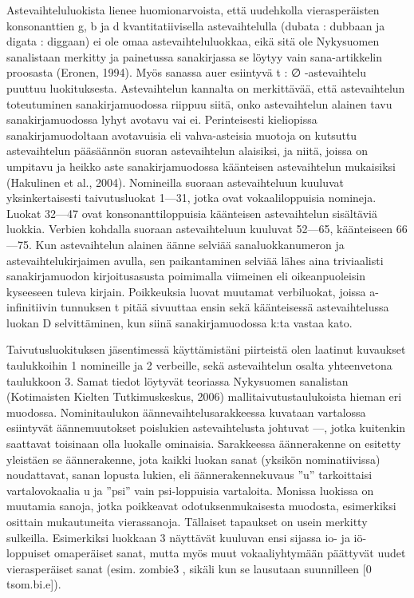 \documentclass[free]{flammie}
\begin{document}
Astevaihteluluokista lienee huomionarvoista, että uudehkolla vierasperäisten konsonanttien g, b ja d kvantitatiivisella astevaihtelulla (dubata : dubbaan ja digata :
diggaan) ei ole omaa astevaihteluluokkaa, eikä sitä ole Nykysuomen sanalistaan
merkitty ja painetussa sanakirjassa se löytyy vain sana-artikkelin proosasta (Eronen, 1994). Myös sanassa auer esiintyvä t : ∅ -astevaihtelu puuttuu luokituksesta.
Astevaihtelun kannalta on merkittävää, että astevaihtelun toteutuminen sanakirjamuodossa riippuu siitä, onko astevaihtelun alainen tavu sanakirjamuodossa lyhyt avotavu vai ei. Perinteisesti kieliopissa sanakirjamuodoltaan avotavuisia eli
vahva-asteisia muotoja on kutsuttu astevaihtelun pääsäännön suoran astevaihtelun
alaisiksi, ja niitä, joissa on umpitavu ja heikko aste sanakirjamuodossa käänteisen
astevaihtelun mukaisiksi (Hakulinen et al., 2004). Nomineilla suoraan astevaihteluun kuuluvat yksinkertaisesti taivutusluokat 1—31, jotka ovat vokaaliloppuisia
nomineja. Luokat 32—47 ovat konsonanttiloppuisia käänteisen astevaihtelun sisältäviä luokkia. Verbien kohdalla suoraan astevaihteluun kuuluvat 52—65, käänteiseen 66—75. Kun astevaihtelun alainen äänne selviää sanaluokkanumeron ja
astevaihtelukirjaimen avulla, sen paikantaminen selviää lähes aina triviaalisti sanakirjamuodon kirjoitusasusta poimimalla viimeinen eli oikeanpuoleisin kyseeseen tuleva kirjain. Poikkeuksia luovat muutamat verbiluokat, joissa a-infinitiivin
tunnuksen t pitää sivuuttaa ensin sekä käänteisessä astevaihtelussa luokan D selvittäminen, kun siinä sanakirjamuodossa k:ta vastaa kato.

Taivutusluokituksen jäsentimessä käyttämistäni piirteistä olen laatinut kuvaukset
taulukkoihin 1 nomineille ja 2 verbeille, sekä astevaihtelun osalta yhteenvetona
taulukkoon 3. Samat tiedot löytyvät teoriassa Nykysuomen sanalistan (Kotimaisten Kielten Tutkimuskeskus, 2006) mallitaivutustaulukoista hieman eri muodossa.
Nominitaulukon äännevaihtelusarakkeessa kuvataan vartalossa esiintyvät äännemuutokset poislukien astevaihtelusta johtuvat —, jotka kuitenkin saattavat toisinaan olla luokalle ominaisia. Sarakkeessa äännerakenne on esitetty yleistäen se
äännerakenne, jota kaikki luokan sanat (yksikön nominatiivissa) noudattavat, sanan lopusta lukien, eli äännerakennekuvaus ”u” tarkoittaisi vartalovokaalia u ja
”psi” vain psi-loppuisia vartaloita. Monissa luokissa on muutamia sanoja, jotka poikkeavat odotuksenmukaisesta muodosta, esimerkiksi osittain mukautuneita
vierassanoja. Tällaiset tapaukset on usein merkitty sulkeilla. Esimerkiksi luokkaan 3 näyttävät kuuluvan ensi sijassa io- ja iö-loppuiset omaperäiset sanat, mutta
myös muut vokaaliyhtymään päättyvät uudet vierasperäiset sanat (esim. zombie3 ,
sikäli kun se lausutaan suunnilleen [0 tsom.bi.e]).
\end{document}

